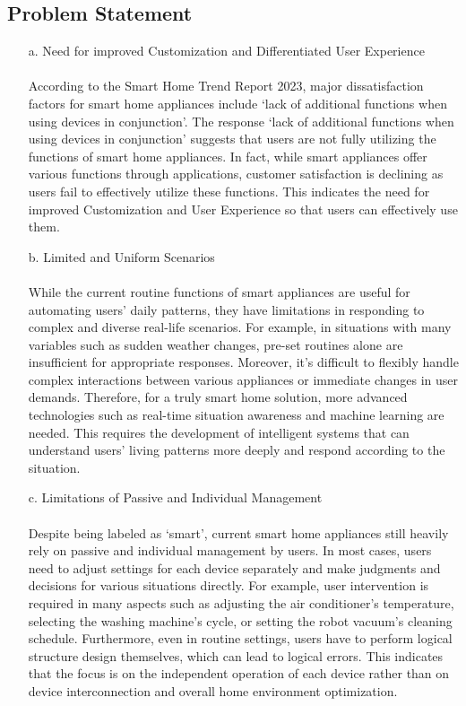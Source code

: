 \documentclass[conference]{IEEEtran}
\begin{document}
\subsection{Problem Statement}
\begin{itemize}
    \item [a.] Need for improved Customization and Differentiated User Experience \\ \\
    According to the Smart Home Trend Report 2023, major dissatisfaction factors for smart home appliances include `lack of additional functions when using devices in conjunction'. The response `lack of additional functions when using devices in conjunction' suggests that users are not fully utilizing the functions of smart home appliances. In fact, while smart appliances offer various functions through applications, customer satisfaction is declining as users fail to effectively utilize these functions. This indicates the need for improved Customization and User Experience so that users can effectively use them. \\ 
    
    \item [b.] Limited and Uniform Scenarios \\ \\ 
    While the current routine functions of smart appliances are useful for automating users' daily patterns, they have limitations in responding to complex and diverse real-life scenarios. For example, in situations with many variables such as sudden weather changes, pre-set routines alone are insufficient for appropriate responses. Moreover, it's difficult to flexibly handle complex interactions between various appliances or immediate changes in user demands. Therefore, for a truly smart home solution, more advanced technologies such as real-time situation awareness and machine learning are needed. This requires the development of intelligent systems that can understand users' living patterns more deeply and respond according to the situation. \\
    
    \item [c.] Limitations of Passive and Individual Management \\ \\
    Despite being labeled as `smart', current smart home appliances still heavily rely on passive and individual management by users. In most cases, users need to adjust settings for each device separately and make judgments and decisions for various situations directly. For example, user intervention is required in many aspects such as adjusting the air conditioner's temperature, selecting the washing machine's cycle, or setting the robot vacuum's cleaning schedule. Furthermore, even in routine settings, users have to perform logical structure design themselves, which can lead to logical errors. This indicates that the focus is on the independent operation of each device rather than on device interconnection and overall home environment optimization.\\
    

\end{itemize}
\end{document}
